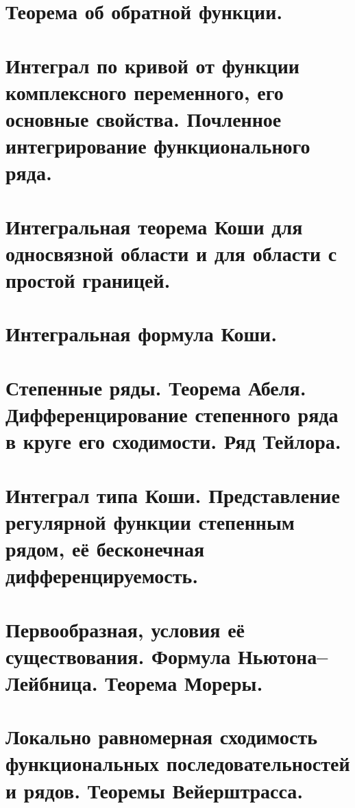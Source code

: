 \section{Теорема об обратной функции.}


\section{Интеграл по кривой от функции комплексного переменного, его основные свойства. Почленное интегрирование функционального ряда.}


\section{Интегральная теорема Коши для односвязной области и для области с простой границей.}


\section{Интегральная формула Коши.}


\section{Степенные ряды. Теорема Абеля. Дифференцирование степенного ряда в круге его сходимости. Ряд Тейлора.}


\section{Интеграл типа Коши. Представление регулярной функции степенным рядом, её бесконечная дифференцируемость.}


\section{Первообразная, условия её существования. Формула Ньютона--Лейбница. Теорема Мореры.}


\section{Локально равномерная сходимость функциональных последовательностей и рядов. Теоремы Вейерштрасса.}


